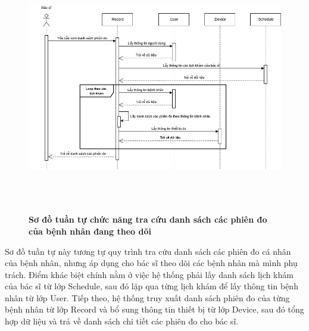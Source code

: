 \begin{figure}[H]
	\centering
	\includegraphics[width=14cm,height=11cm]{Images/sequence/record/getByDoctorId.drawio.png}
	\caption[Sơ đồ tuần tự chức năng tra cứu danh sách các phiên đo của bệnh nhân đang theo dõi]{\bfseries \fontsize{12pt}{0pt}
		\selectfont Sơ đồ tuần tự chức năng tra cứu danh sách các phiên đo của bệnh nhân đang theo dõi}
	\label{sequence_get_record_by_doctor} %
\end{figure}
Sơ đồ tuần tự này tương tự quy trình tra cứu danh sách các phiên đo cá nhân của bệnh nhân, nhưng áp dụng cho bác sĩ theo dõi các bệnh nhân mà mình phụ trách.
Điểm khác biệt chính nằm ở việc hệ thống phải lấy danh sách lịch khám của bác sĩ từ lớp Schedule, sau đó lặp qua từng lịch khám để lấy thông tin bệnh nhân từ lớp User.
Tiếp theo, hệ thống truy xuất danh sách phiên đo của từng bệnh nhân từ lớp Record và bổ sung thông tin thiết bị từ lớp Device, sau đó tổng hợp dữ liệu và trả về danh sách chi tiết các phiên đo cho bác sĩ.

